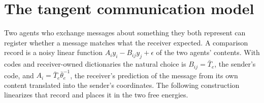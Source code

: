 \documentclass[11pt,letterpaper]{report}
\begin{document}
\begingroup
\small
\tableofcontents
\endgroup
\clearpage
{}

\chapter{The tangent communication model}
\label{it2:ch-model}

Two agents who exchange messages about something they both represent can register whether a message matches what the receiver expected. A comparison record is a noisy linear function $A_iy_i-B_{ij}y_j+\epsilon$ of the two agents' contents. With codes and receiver-owned dictionaries the natural choice is $B_{ij}=\bar T_e$, the sender's code, and $A_i=\bar T_e\bar\theta_e^{-1}$, the receiver's prediction of the message from its own content translated into the sender's coordinates. The following construction linearizes that record and places it in the two free energies.
\end{document}
